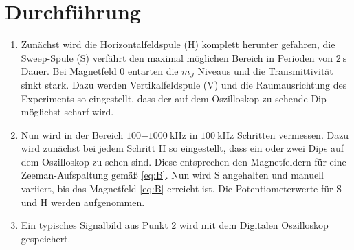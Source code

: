 

\section{Durchführung}
\label{sub:durchfuehrung}
	\begin{enumerate}
	\item Zunächst wird die Horizontalfeldspule (H) komplett herunter
		gefahren, die Sweep-Spule (S) verfährt den maximal möglichen
		Bereich in Perioden von $\SI{2}{\second}$ Dauer. Bei Magnetfeld
		$0$
		entarten die $m_J$ Niveaus und
		die Transmittivität sinkt stark. Dazu werden Vertikalfeldspule (V)
		und die Raumausrichtung des Experiments so eingestellt, dass
		der auf dem Oszilloskop zu sehende Dip möglichst scharf wird.
	\item Nun wird in der Bereich $\SI{100-1000}{\kilo\hertz}$ in
		$\SI{100}{\kilo\hertz}$ Schritten vermessen. Dazu wird zunächst
		bei jedem Schritt H so eingestellt, dass ein oder zwei Dips
		auf dem Oszilloskop zu sehen sind. Diese entsprechen den
		Magnetfeldern für eine Zeeman-Aufspaltung gemäß \eqref{eq:B}.
		Nun wird S angehalten und manuell variiert, bis das Magnetfeld
		\eqref{eq:B} erreicht ist. Die Potentiometerwerte für S und H
		werden aufgenommen.
	\item Ein typisches Signalbild aus Punkt 2 wird mit dem
		Digitalen Oszilloskop gespeichert.
	\end{enumerate}
